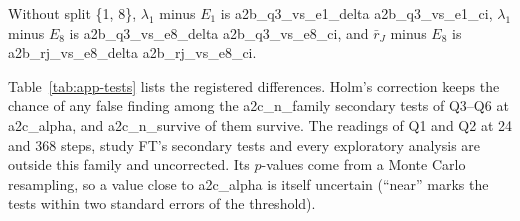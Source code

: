 Without split \{1, 8\}, $\lambda_1$ minus $E_1$ is {{a2b_q3_vs_e1_delta}} {{a2b_q3_vs_e1_ci}}, $\lambda_1$ minus $E_8$ is
{{a2b_q3_vs_e8_delta}} {{a2b_q3_vs_e8_ci}}, and $\bar r_J$ minus $E_8$ is {{a2b_rj_vs_e8_delta}} {{a2b_rj_vs_e8_ci}}.

Table~\ref{tab:app-tests} lists the registered differences. Holm's correction keeps the chance of any false finding among
the {{a2c_n_family}} secondary tests of Q3--Q6 at {{a2c_alpha}}, and {{a2c_n_survive}} of them survive. The readings of Q1 and
Q2 at 24 and 368 steps, study FT's secondary tests and every exploratory analysis are outside this family and
uncorrected. Its $p$-values come from a
Monte Carlo resampling, so a value close to {{a2c_alpha}} is itself uncertain (``near'' marks the tests within two
standard errors of the threshold).

